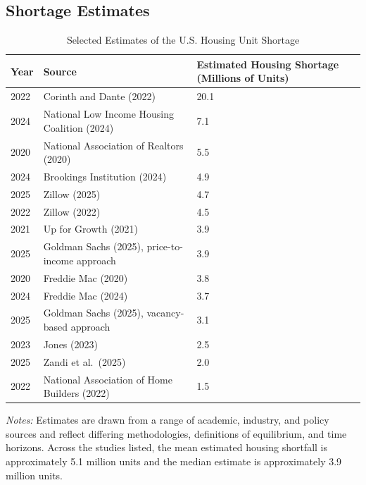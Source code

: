 \documentclass[pdflatex,sn-apa]{sn-jnl}%
\theoremstyle{thmstyleone}%
\theoremstyle{thmstyletwo}%
\theoremstyle{thmstylethree}%
\begin{document}
\begin{appendices}
\section{Shortage Estimates}\label{appendix_a}

\begin{table}[htbp]
	\centering
	\caption{Selected Estimates of the U.S. Housing Unit Shortage}
	\label{tab:housing_shortage_estimates}
	\begin{tabular}{lll}
		\hline
		Year & Source & Estimated Housing Shortage (Millions of Units) \\
		\hline
		2022 & Corinth and Dante (2022) & 20.1 \\
		2024 & National Low Income Housing Coalition (2024) & 7.1 \\
		2020 & National Association of Realtors (2020) & 5.5 \\
		2024 & Brookings Institution (2024) & 4.9 \\
		2025 & Zillow (2025) & 4.7 \\
		2022 & Zillow (2022) & 4.5 \\
		2021 & Up for Growth (2021) & 3.9 \\
		2025 & Goldman Sachs (2025), price-to-income approach & 3.9 \\
		2020 & Freddie Mac (2020) & 3.8 \\
		2024 & Freddie Mac (2024) & 3.7 \\
		2025 & Goldman Sachs (2025), vacancy-based approach & 3.1 \\
		2023 & Jones (2023) & 2.5 \\
		2025 & Zandi et al.\ (2025) & 2.0 \\
		2022 & National Association of Home Builders (2022) & 1.5 \\
		\hline
	\end{tabular}
	\begin{flushleft}
		\footnotesize
		\textit{Notes:} Estimates are drawn from a range of academic, industry, and policy sources and reflect differing methodologies, definitions of equilibrium, and time horizons. Across the studies listed, the mean estimated housing shortfall is approximately 5.1 million units and the median estimate is approximately 3.9 million units.
	\end{flushleft}
\end{table}

% 
% 
% 
% 
% 
% 
\clearpage
\end{appendices}
\end{document}
